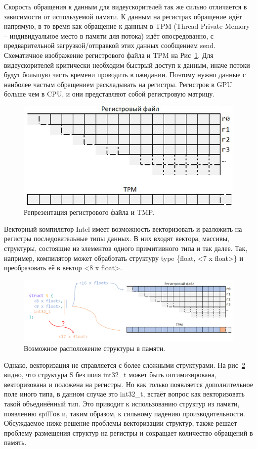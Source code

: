 Скорость обращения к данным для видеускорителей так же сильно отличается в зависимости от используемой памяти. К данным на регистрах обращение идёт напрямую, в то время как обращение к данным в TPM (Thread Private Memory -- индивидуальное место в памяти для потока) идёт опосредованно, с предварительной загрузкой/отправкой этих данных сообщением send. Схематичное изображение регистрового файла и TPM на Рис~\ref{fig:mem}. Для видеускорителей критически необходим быстрый доступ к данным, иначе потоки будут большую часть времени проводить в ожидании. Поэтому нужно данные с наиболее частым обращением раскладывать на регистры. Регистров в GPU больше чем в CPU, и они представляют собой регистровую матрицу.

\begin{figure}[h]
    \centering
    \includegraphics[scale=0.35]{Images/reg_and_tpm.png}
    \caption{Репрезентация регистрового файла и TMP.}
    \label{fig:mem}
\end{figure}

Векторный компилятор Intel имеет возможность векторизовать и разложить на регистры последовательные типы данных. В них входят вектора, массивы, структуры, состоящие из элементов одного примитивного типа и так далее.
Так, например, компилятор может обработать структуру type \{float, <7 x float>\} и преобразовать её в вектор <8 x float>.

\begin{figure}[ht]
    \centering
    \includegraphics[scale=0.21]{Images/reg_and_tpm_lying.png}
    \caption{Возможное расположение структуры в памяти.}
    \label{fig:lying}
\end{figure}

Однако, векторизация не справляется с более сложными структурами. На рис~\ref{fig:lying} видно, что структура S без поля int32\_t может быть оптимизирована, векторизована и положена на регистры.
Но как только появляется дополнительное поле иного типа, в данном случае это int32\_t, встаёт вопрос как векторизовать такой объединённый тип.
Это приводит к использованию структур из памяти, появлению spill'ов и, таким образом, к сильному падению производительности.
Обсуждаемое ниже решение проблемы векторизации структур, также решает проблему размещения структур на регистры и сокращает количество обращений в память.